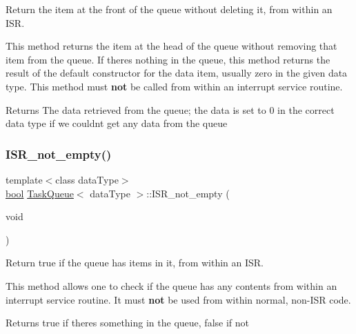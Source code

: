 Return the item at the front of the queue without deleting it, from within an I\+SR. 

This method returns the item at the head of the queue without removing that item from the queue. If there\textquotesingle{}s nothing in the queue, this method returns the result of the default constructor for the data item, usually zero in the given data type. This method must {\bfseries not} be called from within an interrupt service routine. \begin{DoxyReturn}{Returns}
The data retrieved from the queue; the data is set to 0 in the correct data type if we couldn\textquotesingle{}t get any data from the queue 
\end{DoxyReturn}
\mbox{\label{class_task_queue_a805c30a60f68150f538577aaaab39e74}} 
\subsubsection{\texorpdfstring{I\+S\+R\+\_\+not\+\_\+empty()}{ISR\_not\_empty()}}
{\footnotesize\ttfamily template$<$class data\+Type$>$ \\
\mbox{\hyperlink{group___motor___boolean___type_ga0ecf26b576b9a54eca656b9be7ba6a06}{bool}} \mbox{\hyperlink{class_task_queue}{Task\+Queue}}$<$ data\+Type $>$\+::I\+S\+R\+\_\+not\+\_\+empty (\begin{DoxyParamCaption}\item[{void}]{ }\end{DoxyParamCaption})\hspace{0.3cm}{\ttfamily [inline]}}



Return true if the queue has items in it, from within an I\+SR. 

This method allows one to check if the queue has any contents from within an interrupt service routine. It must {\bfseries not} be used from within normal, non-\/\+I\+SR code. \begin{DoxyReturn}{Returns}
{\ttfamily true} if there\textquotesingle{}s something in the queue, {\ttfamily false} if not 
\end{DoxyReturn}
\mbox{\label{class_task_queue_af3589846ebd5b842b0b74ffa7e1029af}} 
